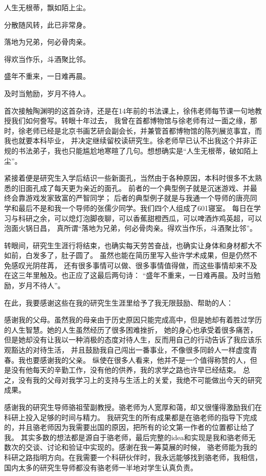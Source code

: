 
\begin{ack}
人生无根蒂，飘如陌上尘。

分散随风转，此已非常身。

落地为兄弟，何必骨肉亲。

得欢当作乐，斗酒聚比邻。

盛年不重来，一日难再晨。

及时当勉励，岁月不待人。


首次接触陶渊明的这首杂诗，还是在14年前的书法课上，徐伟老师每节课一句地教授我们如何誊写。转眼十年过去， 我曾在首都博物馆与徐老师有过一面之缘，那时，徐老师已经是北京书画艺研会副会长，并兼管首都博物馆的陈列展览事宜，而我也就要本科毕业， 并决定继续留校读研究生。徐老师早已认不出我这个并非正规的书法弟子，我也只能尴尬地寒暄了几句。想想确实是“人生无根蒂，破如陌上尘”。

紧接着便是研究生入学后结识一些新面孔，当然由于各种原因，本科时很多不太熟悉的旧面孔成了每天更为亲近的面孔。 前者的一个典型例子就是沉迷游戏、并最终会靠游戏发家致富的严智同学； 后者的典型例子就是与我通一个导师的唐亮同学和最后不是和我一个导师的张儒少同学。我们四个人组成了601寝室。 每日在学习与科研之余，可以熄灯泡脚夜聊，可以香蕉甜橙西瓜，可以啤酒炸鸡英超，可以泡面火锅日昌， 真所谓“落地为兄弟，何必骨肉亲。得欢当作乐，斗酒聚比邻”。

转眼间，研究生生涯行将结束，也确实每天劳苦奋战，也确实让身体和身材都大不如前，白发多了，肚子圆了。 虽然也能在简历里写入些许学术成果，但是仍然不免感叹光阴荏苒， 还有很多事情可以做、很多事情值得做，而这些事情却来不及在这三年里触及。也正应了这最后两句诗： “盛年不重来，一日难再晨。及时当勉励，岁月不待人”。

在此，我要感谢这些在我的研究生生涯里给予了我无限鼓励、帮助的人：

感谢我的父母。虽然我的母亲由于历史原因只能完成高中，但是她却有着胜过学历的人生智慧。她的人生虽然经历了很多困难挫折， 她的身心也承受着很多痛苦，但是她却没有让我以一种消极的态度对待人生，反而用自己的行动告诉了我应该乐观豁达的对待生活， 并且鼓励我自己闯出一番事业，不像很多同龄人一样虚度青春。我也要感谢我的父亲。 纵使在很多人看来，他并不是一个值得称赞的人，但是没有他每天的辛勤工作，没有他的供养，我的求学之路也许早已经结束。 总之，没有我的父母对我学习上的支持与生活上的关爱，我绝不可能做出今天的研究成果。

感谢我的研究生导师骆祖莹副教授。骆老师为人宽厚和蔼，却又很懂得激励我们在科研上投入足够的时间与精力。 我研究生的所有成果都是在骆老师的指导下完成的，并且骆老师因为我需要出国的原因，把所有的论文第一作者的位置都让给了我。 其实多数的想法都是源自于骆老师，最后完整的idea和实现是我和骆老师无数次的交谈、讨论和验证中实现的。感谢在我一筹莫展的时候， 骆老师能为我的科研之路指明方向。在我需要一个科研伙伴时，我永远能够找到骆老师，我相信， 国内太多的研究生导师都没有骆老师一半地对学生认真负责。


\end{ack}
